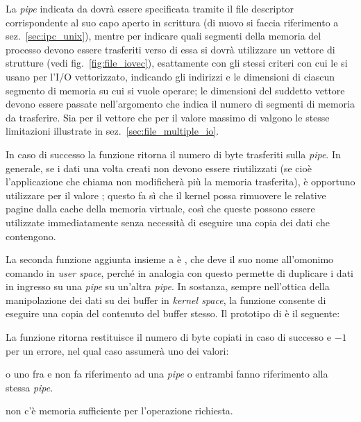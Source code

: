 La \textit{pipe} indicata da  dovrà essere specificata tramite il
file descriptor corrispondente al suo capo aperto in scrittura (di nuovo si
faccia riferimento a sez.~\ref{sec:ipc_unix}), mentre per indicare quali
segmenti della memoria del processo devono essere trasferiti verso di essa si
dovrà utilizzare un vettore di strutture  (vedi
fig.~\ref{fig:file_iovec}), esattamente con gli stessi criteri con cui le si
usano per l'I/O vettorizzato, indicando gli indirizzi e le dimensioni di
ciascun segmento di memoria su cui si vuole operare; le dimensioni del
suddetto vettore devono essere passate nell'argomento  che
indica il numero di segmenti di memoria da trasferire.  Sia per il vettore che
per il valore massimo di  valgono le stesse limitazioni
illustrate in sez.~\ref{sec:file_multiple_io}.

In caso di successo la funzione ritorna il numero di byte trasferiti sulla
\textit{pipe}. In generale, se i dati una volta creati non devono essere
riutilizzati (se cioè l'applicazione che chiama  non
modificherà più la memoria trasferita), è opportuno utilizzare
per  il valore ; questo fa sì che il kernel
possa rimuovere le relative pagine dalla cache della memoria virtuale, così
che queste possono essere utilizzate immediatamente senza necessità di
eseguire una copia dei dati che contengono.

La seconda funzione aggiunta insieme a  è , che deve il
suo nome all'omonimo comando in \textit{user space}, perché in analogia con
questo permette di duplicare i dati in ingresso su una \textit{pipe} su
un'altra \textit{pipe}. In sostanza, sempre nell'ottica della manipolazione
dei dati su dei buffer in \textit{kernel space}, la funzione consente di
eseguire una copia del contenuto del buffer stesso. Il prototipo di
 è il seguente:

\begin{funcproto}{
}

{La funzione ritorna restituisce il numero di byte copiati in caso di successo
  e $-1$ per un errore, nel qual caso  assumerà uno dei valori:
  \begin{errlist}
    \item[\errcode{EINVAL}] o uno fra  e  non fa
      riferimento ad una \textit{pipe} o entrambi fanno riferimento alla
      stessa \textit{pipe}.
    \item[\errcode{ENOMEM}] non c'è memoria sufficiente per l'operazione
      richiesta.
  \end{errlist}
}
\end{funcproto}

